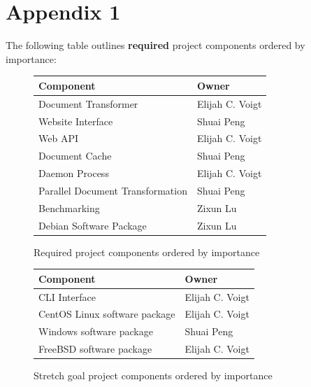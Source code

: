 \section{Appendix 1}


The following table outlines \textbf{required} project components ordered by importance:

\begin{figure}[H]
  \begin{center}
    \begin{tabular}{ | l | l | }
    \hline
      Component & Owner \\ \hline
      Document Transformer & Elijah C. Voigt \\ \hline
      Website Interface & Shuai Peng \\ \hline
      Web API & Elijah C. Voigt \\ \hline
      Document Cache & Shuai Peng \\ \hline
      Daemon Process & Elijah C. Voigt \\ \hline
      Parallel Document Transformation & Shuai Peng\\ \hline
      Benchmarking & Zixun Lu \\ \hline
      Debian Software Package & Zixun Lu \\ \hline
    \end{tabular}
  \end{center}
  \caption{Required project components ordered by importance}
\end{figure}

\begin{figure}[H]
  \begin{center}
    \begin{tabular}{ | l | l | }
    \hline
      Component & Owner \\ \hline
      CLI Interface & Elijah C. Voigt \\ \hline
      CentOS Linux software package & Elijah C. Voigt \\ \hline
      Windows software package & Shuai Peng \\ \hline
      FreeBSD software package & Elijah C. Voigt  \\ \hline
    \end{tabular}
  \end{center}
  \caption{Stretch goal project components ordered by importance}
\end{figure}


